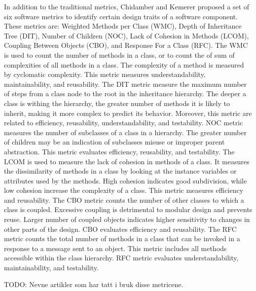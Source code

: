 In addition to the traditional metrics, Chidamber and Kemerer\cite{chidamber1994metrics} proposed a set of six software metrics to identify certain design traits of a software component. These metrics are: Weighted Methods per Class (WMC), Depth of Inheritance Tree (DIT), Number of Children (NOC), Lack of Cohesion in Methods (LCOM), Coupling Between Objects (CBO), and Response For a Class (RFC). The WMC is used to count the number of methods in a class, or to count the of sum of complexities of all methods in a class. The complexity of a method is measured by cyclomatic complexity. This metric measures understandability, maintainability, and reusability\cite{quenelobject}. The DIT metric measure the maximum number of steps from a class node to the root in the inheritance hierarchy. The deeper a class is withing the hierarchy, the greater number of methods it is likely to inherit, making it more complex to predict its behavior\cite{quenelobject}. Moreover, this metric are related to efficiency, reusability, understandability, and testability\cite{quenelobject}. NOC metric measures the number of subclasses of a class in a hierarchy. The greater number of children may be an indication of subclasses misuse or improper parent abstraction. This metric evaluates efficiency, reusability, and testability\cite{quenelobject}. The LCOM is used to measure the lack of cohesion in methods of a class. It measures the dissimilarity of methods in a class by looking at the instance variables or attributes used by the methods. High cohesion indicates good subdivision, while low cohesion increase the complexity of a class. This metric measures efficiency and reusability\cite{quenelobject}. The CBO metric counts the number of other classes to which a class is coupled. Excessive coupling is detrimental to modular design and prevents reuse\cite{quenelobject}. Larger number of coupled objects indicates higher sensitivity to changes in other parts of the design. CBO evaluates efficiency and reusability\cite{quenelobject}. The RFC metric counts the total number of methods in a class that can be invoked in a response to a message sent to an object. This metric includes all methods accessible within the class hierarchy. RFC metric evaluates understandability, maintainability, and testability\cite{quenelobject}.

TODO: Nevne artikler som har tatt i bruk disse metricene.









